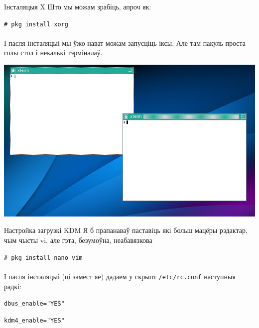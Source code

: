 \documentclass[ignorenonframetext,hyperref={pdftex,unicode}]{beamer}
\begin{document}
\begin{frame}{Інсталяцыя X} %
	Што мы можам зрабіць, апроч як:

	\texttt{\# pkg install xorg} \pause
	\\~\\	
	І пасля інсталяцыі мы ўжо нават можам запусціць іксы. Але там пакуль проста голы стол і некалькі тэрміналаў.
	\begin{center}
 		\includegraphics[height=0.6\textheight,keepaspectratio]{TWM} %
	\end{center}
\end{frame} %

\begin{frame}{Настройка загрузкі KDM} %
	Я б прапанаваў паставіць які больш мацёры рэдактар, чым чысты vi, але гэта, безумоўна, неабавязкова

	\texttt{\# pkg install nano vim} \pause
	\\~\\	
	І пасля інсталяцыі (ці замест яе) дадаем у скрыпт \texttt{/etc/rc.conf} наступныя радкі:

	\texttt{dbus\_enable="YES"}
	
	\texttt{kdm4\_enable="YES"}
\end{frame} %
\end{document}
